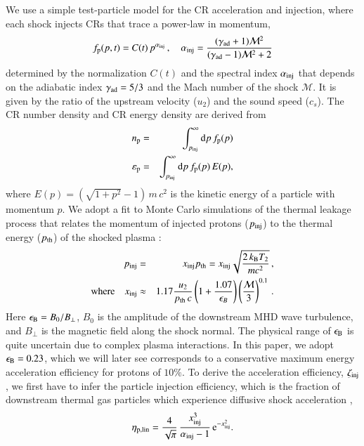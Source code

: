 \documentclass[fleqn,usenatbib,useAMS]{mnras}
\newcommand{\dd}{\mathrm{d}}
\newcommand\eb{\epsilon_\rmn{B}}
\newcommand{\p}{\rmn{p}}
\newcommand{\kB}{k_{\rmn{B}}}
\newcommand{\eps}{\varepsilon}
\begin{document}
We use a simple test-particle model for the CR acceleration and
injection, where each shock injects CRs that trace a power-law in
momentum,
\begin{equation}
  f_\p(p,t) = C(t)\,p^{\alpha_\rmn{inj}}\,,\quad
  \alpha_\rmn{inj}=\frac{(\gamma_\rmn{ad}+1)\mathcal{M}^2}
        {(\gamma_\rmn{ad}-1)\mathcal{M}^2+2}
\end{equation}
determined by the normalization $C(t)$ and the spectral index
$\alpha_{{\mathrm{inj}}}$ that depends on the adiabatic index
$\gamma_{\mathrm{ad}} = 5/3$ and the Mach number of the shock
$\mathcal{M}$. It is given by the ratio of the upstream velocity
($u_2$) and the sound speed ($c_s$). The CR number density and CR
energy density are derived from
\begin{eqnarray}
n_\rmn{p} &=&
\int_{p_\rmn{inj}}^\infty \dd p\, f_\p(p)\\
\eps_\rmn{p} &=&
\int_{p_\rmn{inj}}^\infty \dd p\, f_\p(p) \,E(p),
\end{eqnarray}
where $E(p) = (\sqrt{1+p^2} -1)\, m\,c^2$ is the kinetic energy of a
particle with momentum $p$. We adopt a fit to Monte Carlo simulations
of the thermal leakage process that relates the momentum of injected
protons ($p_{\mathrm{inj}}$) to the thermal energy ($p_{\mathrm{th}}$) of the
shocked plasma \citep{kang11}:
\begin{eqnarray}
  \label{eq:qinj}
  p_\rmn{inj} &=& x_\rmn{inj} p_\rmn{th} = x_\rmn{inj} \sqrt{\frac{2 \,\kB T_2}{m c^2}}\,, \nonumber \\
  \rmn{where}\quad x_\rmn{inj} &\approx& 1.17 \frac{u_2}{p_{\rmn{th}}\,c} \left(1+
  \frac{1.07}{\epsilon_B}\right) \left(\frac{\mathcal{M}}{3}\right)^{0.1}\,.
\end{eqnarray}
Here $\eb = B_0/B_{\perp}$, $B_0$ is the amplitude of the downstream
MHD wave turbulence, and $B_{\perp}$ is the magnetic field along the
shock normal. The physical range of $\eb$ is quite uncertain due to
complex plasma interactions. In this paper, we adopt $\eb = 0.23$,
which we will later see corresponds to a conservative maximum energy
acceleration efficiency for protons of $10\%$. To derive the
acceleration efficiency, $\zeta_{\mathrm{inj}}$, we first have to infer the
particle injection efficiency, which is the fraction of downstream
thermal gas particles which experience diffusive shock acceleration
\citep[for details see ][]{pinzke13},
\begin{equation}
  \label{eq:eta}
  \eta_{\mathrm{p,lin}} =
  \frac{4}{\sqrt{\pi}}\,\frac{x_{\mathrm{inj}}^3}{\alpha_{\mathrm{inj}}-1}\,
  {\mathrm{e}}^{-x_{\mathrm{inj}}^2}.
\end{equation}
\end{document}
